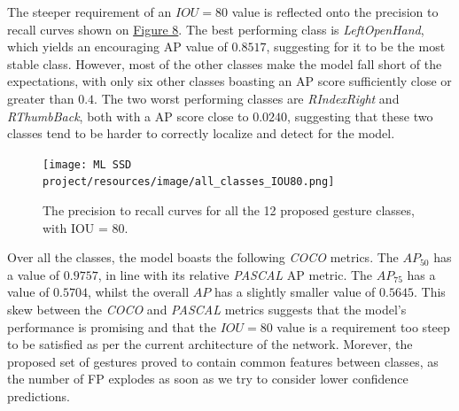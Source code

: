\documentclass[10pt,twocolumn,letterpaper]{article}
\begin{document}
\begin{flushleft}
The steeper requirement of an $IOU=80$ value is reflected onto the precision to recall curves shown on \hyperref[figure8]{Figure 8}. The best performing class is \textit{LeftOpenHand}, which yields an encouraging AP value of $0.8517$, suggesting for it to be the most stable class. However, most of the other classes make the model fall short of the expectations, with only six other classes boasting an AP score sufficiently close or greater than $0.4$. The two worst performing classes are \textit{RIndexRight} and \textit{RThumbBack}, both with a AP score close to $0.0240$, suggesting that these two classes tend to be harder to correctly localize and detect for the model.

\begin{figure}[!h]
    \centering
    \texttt{[image: ML SSD project/resources/image/all\_classes\_IOU80.png]}
    \caption{The precision to recall curves for all the 12 proposed gesture classes, with IOU = 80.}
\end{figure}
\label{figure8}

Over all the classes, the model boasts the following \textit{COCO} metrics. The $AP_{50}$ has a value of $0.9757$, in line with its relative \textit{PASCAL} AP metric. The $AP_{75}$ has a value of $0.5704$, whilst the overall $AP$ has a slightly smaller value of $0.5645$. This skew between the \textit{COCO} and \textit{PASCAL} metrics suggests that the model's performance is promising and that the $IOU=80$ value is a requirement too steep to be satisfied as per the current architecture of the network. Morever, the proposed set of gestures proved to contain common features between classes, as the number of FP explodes as soon as we try to consider lower confidence predictions.

\end{flushleft}
\end{document}
